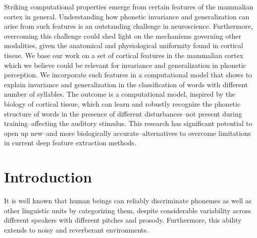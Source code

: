\documentclass[10pt,letterpaper]{article}
\begin{document}
Striking computational properties emerge from certain features of the mammalian cortex in general. Understanding how phonetic invariance and generalization can arise from such features is an outstanding challenge in neuroscience. Furthermore, overcoming this challenge could shed light on the mechanisms governing other modalities, given the anatomical and physiological uniformity found in cortical tissue. We base our work on a set of cortical features in the mammalian cortex which we believe could be relevant for invariance and generalization in phonetic perception. We incorporate such features in a computational model that shows to explain invariance and generalization in the classification of words with different number of syllables. The outcome is a computational model, inspired by the biology of cortical tissue, which can learn and robustly recognize the phonetic structure of words in the presence of different disturbances--not present during training--affecting the auditory stimulus. This research has significant potential to open up new--and more biologically accurate--alternatives to overcome limitations in current deep feature extraction methods.



\linenumbers

\section*{Introduction}





It is well known that human beings can reliably discriminate phonemes as well as other linguistic units by categorizing them, despite considerable variability across different speakers with different pitches and prosody. Furthermore, this ability extends to noisy and reverberant environments.
\end{document}
